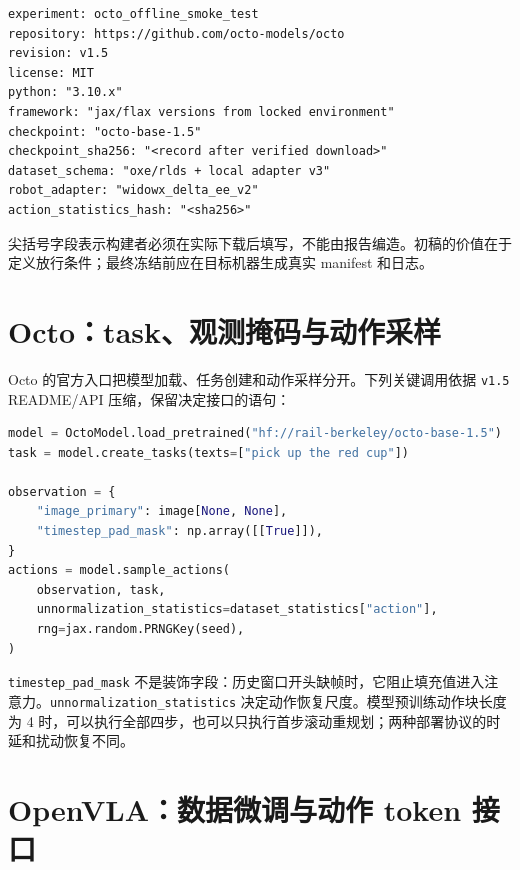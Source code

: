 \begin{lstlisting}[caption={建议的复现 manifest 骨架，不以浮动 latest 作为版本}]
experiment: octo_offline_smoke_test
repository: https://github.com/octo-models/octo
revision: v1.5
license: MIT
python: "3.10.x"
framework: "jax/flax versions from locked environment"
checkpoint: "octo-base-1.5"
checkpoint_sha256: "<record after verified download>"
dataset_schema: "oxe/rlds + local adapter v3"
robot_adapter: "widowx_delta_ee_v2"
action_statistics_hash: "<sha256>"
\end{lstlisting}

尖括号字段表示构建者必须在实际下载后填写，不能由报告编造。初稿的价值在于定义放行条件；最终冻结前应在目标机器生成真实 manifest 和日志。

\section{Octo：task、观测掩码与动作采样}

Octo 的官方入口把模型加载、任务创建和动作采样分开\cite{octo15code}。下列关键调用依据 \texttt{v1.5} README/API 压缩，保留决定接口的语句：

\begin{lstlisting}[language=Python,caption={Octo v1.5 推理关键路径（MIT；按官方 API 压缩）}]
model = OctoModel.load_pretrained("hf://rail-berkeley/octo-base-1.5")
task = model.create_tasks(texts=["pick up the red cup"])

observation = {
    "image_primary": image[None, None],
    "timestep_pad_mask": np.array([[True]]),
}
actions = model.sample_actions(
    observation, task,
    unnormalization_statistics=dataset_statistics["action"],
    rng=jax.random.PRNGKey(seed),
)
\end{lstlisting}

\texttt{timestep\_pad\_mask} 不是装饰字段：历史窗口开头缺帧时，它阻止填充值进入注意力。\texttt{unnormalization\_statistics} 决定动作恢复尺度。模型预训练动作块长度为 4 时，可以执行全部四步，也可以只执行首步滚动重规划；两种部署协议的时延和扰动恢复不同。

\section{OpenVLA：数据微调与动作 token 接口}

